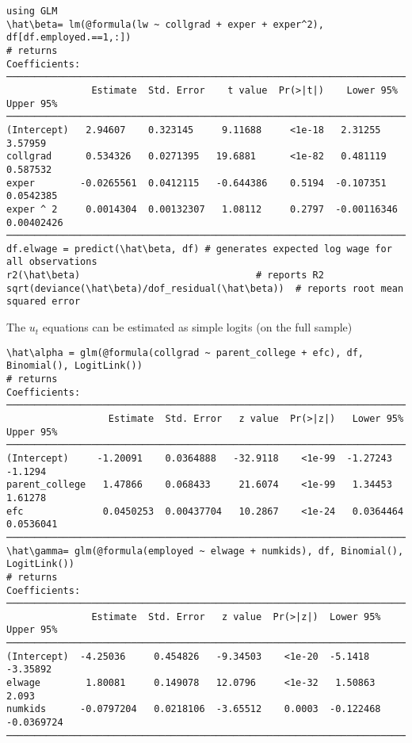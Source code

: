 \documentclass[11pt]{article}
\begin{document}
\begin{verbatim}
using GLM
\hat\beta= lm(@formula(lw ~ collgrad + exper + exper^2), df[df.employed.==1,:])
# returns
Coefficients:
─────────────────────────────────────────────────────────────────────────────────
               Estimate  Std. Error    t value  Pr(>|t|)    Lower 95%   Upper 95%
─────────────────────────────────────────────────────────────────────────────────
(Intercept)   2.94607    0.323145     9.11688     <1e-18   2.31255     3.57959
collgrad      0.534326   0.0271395   19.6881      <1e-82   0.481119    0.587532
exper        -0.0265561  0.0412115   -0.644386    0.5194  -0.107351    0.0542385
exper ^ 2     0.0014304  0.00132307   1.08112     0.2797  -0.00116346  0.00402426
─────────────────────────────────────────────────────────────────────────────────
df.elwage = predict(\hat\beta, df) # generates expected log wage for all observations
r2(\hat\beta)                               # reports R2
sqrt(deviance(\hat\beta)/dof_residual(\hat\beta))  # reports root mean squared error
\end{verbatim}


The \(u_t\) equations can be estimated as simple logits (on the full sample)

\begin{verbatim}
\hat\alpha = glm(@formula(collgrad ~ parent_college + efc), df, Binomial(), LogitLink())
# returns
Coefficients:
──────────────────────────────────────────────────────────────────────────────────
                  Estimate  Std. Error   z value  Pr(>|z|)   Lower 95%   Upper 95%
──────────────────────────────────────────────────────────────────────────────────
(Intercept)     -1.20091    0.0364888   -32.9118    <1e-99  -1.27243    -1.1294
parent_college   1.47866    0.068433     21.6074    <1e-99   1.34453     1.61278
efc              0.0450253  0.00437704   10.2867    <1e-24   0.0364464   0.0536041
──────────────────────────────────────────────────────────────────────────────────
\hat\gamma= glm(@formula(employed ~ elwage + numkids), df, Binomial(), LogitLink())
# returns
Coefficients:
──────────────────────────────────────────────────────────────────────────────
               Estimate  Std. Error   z value  Pr(>|z|)  Lower 95%   Upper 95%
──────────────────────────────────────────────────────────────────────────────
(Intercept)  -4.25036     0.454826   -9.34503    <1e-20  -5.1418    -3.35892
elwage        1.80081     0.149078   12.0796     <1e-32   1.50863    2.093
numkids      -0.0797204   0.0218106  -3.65512    0.0003  -0.122468  -0.0369724
──────────────────────────────────────────────────────────────────────────────
\end{verbatim}
\end{document}

